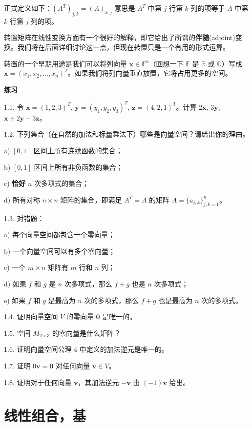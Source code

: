 正式定义如下：$(A^T)_{j,k} = (A)_{k,j}$ 意思是 $A^T$ 中第 $j$ 行第 $k$ 列的项等于 $A$ 中第 $k$ 行第 $j$ 列的项。

转置矩阵在线性变换方面有一个很好的解释，即它给出了所谓的\textbf{伴随}(adjoint)变换。我们将在后面详细讨论这一点，但现在转置只是一个有用的形式运算。

转置的一个早期用途是我们可以将列向量 $\mathbf{x} \in \mathbb{F}^n$（回想一下 $\mathbb{F}$ 是 $\mathbb{R}$ 或 $\mathbb{C}$）写成 $\mathbf{x} = (x_1, x_2, \dots, x_n)^T$。如果我们将列向量垂直放置，它将占用更多的空间。

\textbf{练习}~

1.1. 令 $\mathbf{x} = (1, 2, 3)^T$, $\mathbf{y} = (y_1, y_2, y_3)^T$, $\mathbf{z} = (4, 2, 1)^T$。计算 $2\mathbf{x}$, $3\mathbf{y}$, $\mathbf{x} + 2\mathbf{y} - 3\mathbf{z}$。

1.2. 下列集合（在自然的加法和标量乘法下）哪些是向量空间？请给出你的理由。

a) $[0, 1]$ 区间上所有连续函数的集合；

b) $[0, 1]$ 区间上所有非负函数的集合；

c) \textbf{恰好} $n$ 次多项式的集合；

d) 所有对称 $n \times n$ 矩阵的集合，即满足 $A^T = A$ 的矩阵 $A = \{a_{j,k}\}_{j,k=1}^n $。


1.3. 对错题：

a) 每个向量空间都包含一个零向量；

b) 一个向量空间可以有多个零向量；

c) 一个 $m \times n$ 矩阵有 $m$ 行和 $n$ 列；

d) 如果 $f$ 和 $g$ 是 $n$ 次多项式，那么 $f+g$ 也是 $n$ 次多项式；

e) 如果 $f$ 和 $g$ 是最高为 $n$ 次的多项式，那么 $f+g$ 也是最高为 $n$ 次的多项式。

1.4. 证明向量空间 $V$ 的零向量 $\mathbf{0}$ 是唯一的。

1.5. 空间 $M_{2 \times 3}$ 的零向量是什么矩阵？

1.6. 证明向量空间公理 4 中定义的加法逆元是唯一的。

1.7. 证明 $0 \mathbf{v} = \mathbf{0}$ 对任何向量 $\mathbf{v} \in V$。

1.8. 证明对于任何向量 $\mathbf{v}$，其加法逆元 $-\mathbf{v}$ 由 $(-1)\mathbf{v}$ 给出。



\section{线性组合，基}

